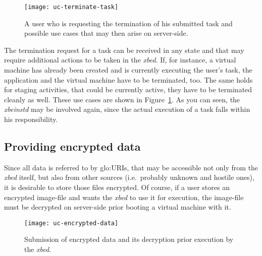 \begin{figure}[h!]
  \centering
  \texttt{[image: uc-terminate-task]}
  \caption[UC Terminate Task]{A user  who is requesting the termination of
    his  submitted task  and possible  use cases  that may  then  arise on
    server-side.}
  \label{fig:uc-terminate-task}
\end{figure}

The termination request  for a task can be received in  any state and that
may require  additional actions to be  taken in the  \emph{xbed}.  If, for
instance,  a virtual  machine has  already been  created and  is currently
executing the user's task, the application and the virtual machine have to
be terminated, too.  The same  holds for staging activities, that could be
currently active, they  have to be terminated cleanly  as well.  These use
cases are  shown in  Figure~\ref{fig:uc-terminate-task}. As you  can seen,
the \emph{xbeinstd} may be involved again, since the actual execution of a
task falls within his responsibility.

\subsection{Providing encrypted data}
\label{sec:uc-ecrypted-data}

Since all  data is referred to  by \gls{glo:URI}s, that  may be accessible
not  only  from  the  \emph{xbed}  itself, but  also  from  other  sources
(i.e.~probably unknown and  hostile ones), it is desirable  to store those
files encrypted. Of  course, if a user stores  an encrypted image-file and
wants  the \emph{xbed} to  use it  for execution,  the image-file  must be
decrypted on server-side prior booting a virtual machine with it.

\begin{figure}[h!]
  \centering
  \texttt{[image: uc-encrypted-data]}
  \caption[UC  Encrypted  Data]{Submission   of  encrypted  data  and  its
    decryption prior execution by the \emph{xbed}.}
  \label{fig:uc-encrypt-data}
\end{figure}

